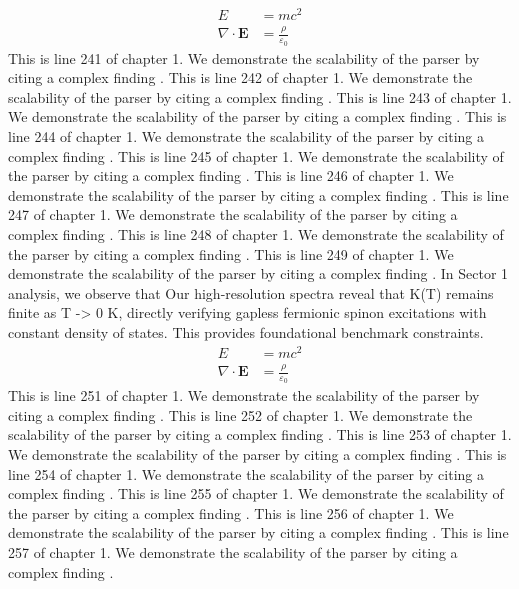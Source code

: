 \begin{align*}
  E &= mc^2 \\
  \nabla \cdot \mathbf{E} &= \frac{\rho}{\varepsilon_0}
\end{align*}
This is line 241 of chapter 1. We demonstrate the scalability of the parser by citing a complex finding \cite{ref1_241}.
This is line 242 of chapter 1. We demonstrate the scalability of the parser by citing a complex finding \cite{ref1_242}.
This is line 243 of chapter 1. We demonstrate the scalability of the parser by citing a complex finding \cite{ref1_243}.
This is line 244 of chapter 1. We demonstrate the scalability of the parser by citing a complex finding \cite{ref1_244}.
This is line 245 of chapter 1. We demonstrate the scalability of the parser by citing a complex finding \cite{ref1_245}.
This is line 246 of chapter 1. We demonstrate the scalability of the parser by citing a complex finding \cite{ref1_246}.
This is line 247 of chapter 1. We demonstrate the scalability of the parser by citing a complex finding \cite{ref1_247}.
This is line 248 of chapter 1. We demonstrate the scalability of the parser by citing a complex finding \cite{ref1_248}.
This is line 249 of chapter 1. We demonstrate the scalability of the parser by citing a complex finding \cite{ref1_249}.
In Sector 1 analysis, we observe that Our high-resolution spectra reveal that K(T) remains finite as T -> 0 K, directly verifying gapless fermionic spinon excitations with constant density of states. This provides foundational benchmark constraints.
\begin{align*}
  E &= mc^2 \\
  \nabla \cdot \mathbf{E} &= \frac{\rho}{\varepsilon_0}
\end{align*}
This is line 251 of chapter 1. We demonstrate the scalability of the parser by citing a complex finding \cite{ref1_251}.
This is line 252 of chapter 1. We demonstrate the scalability of the parser by citing a complex finding \cite{ref1_252}.
This is line 253 of chapter 1. We demonstrate the scalability of the parser by citing a complex finding \cite{ref1_253}.
This is line 254 of chapter 1. We demonstrate the scalability of the parser by citing a complex finding \cite{ref1_254}.
This is line 255 of chapter 1. We demonstrate the scalability of the parser by citing a complex finding \cite{ref1_255}.
This is line 256 of chapter 1. We demonstrate the scalability of the parser by citing a complex finding \cite{ref1_256}.
This is line 257 of chapter 1. We demonstrate the scalability of the parser by citing a complex finding \cite{ref1_257}.
